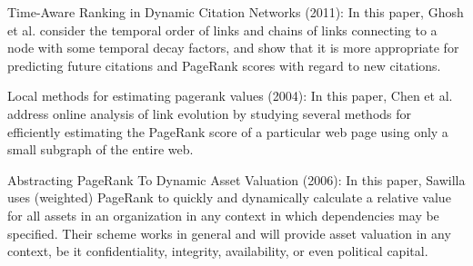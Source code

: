 
Time-Aware Ranking in Dynamic Citation Networks (2011): In this paper, Ghosh et al. \cite{ghosh2011time} consider the temporal order of links and chains of links connecting to a node with some temporal decay factors, and show that it is more appropriate for predicting future citations and PageRank scores with regard to new citations.




Local methods for estimating pagerank values (2004): In this paper, Chen et al. \cite{chen2004local} address online analysis of link evolution by studying several methods for efficiently estimating the PageRank score of a particular web page using only a small subgraph of the entire web.

Abstracting PageRank To Dynamic Asset Valuation (2006): In this paper, Sawilla \cite{sawilla2006abstracting} uses (weighted) PageRank to quickly and dynamically calculate a relative value for all assets in an organization in any context in which dependencies may be specified. Their scheme works in general and will provide asset valuation in any context, be it confidentiality, integrity, availability, or even political capital.

